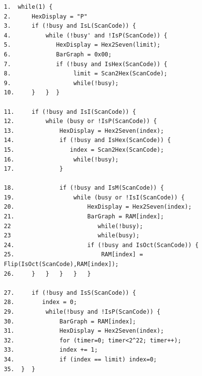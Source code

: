 \documentclass{article}[10 pt,landscape]
\begin{document}
\pagebreak
\begin{verbatim}
1.  while(1) {
2.      HexDisplay = "P"
3.      if (!busy and IsL(ScanCode)) {
4.          while (!busy' and !IsP(ScanCode)) {
5.             HexDisplay = Hex2Seven(limit);
6.             BarGraph = 0x00;
7.             if (!busy and IsHex(ScanCode)) {
8.                  limit = Scan2Hex(ScanCode);
9.                  while(!busy);
10.     }   }  }

11.     if (!busy and IsI(ScanCode)) {
12.         while (busy or !IsP(ScanCode)) {
13.             HexDisplay = Hex2Seven(index);
14.             if (!busy and IsHex(ScanCode)) {
15.                index = Scan2Hex(ScanCode);
16.                 while(!busy);
17.             }

18.             if (!busy and IsM(ScanCode)) {
19.                 while (busy or !IsI(ScanCode)) {
20.                     HexDisplay = Hex2Seven(index);
21.                     BarGraph = RAM[index];
22                         while(!busy);
23                         while(busy);
24.                     if (!busy and IsOct(ScanCode)) {
25.                         RAM[index] = Flip(IsOct(ScanCode),RAM[index]);
26.     }   }   }   }   }

27.     if (!busy and IsS(ScanCode)) {
28.        index = 0;
29.         while(!busy and !IsP(ScanCode)) {
30.             BarGraph = RAM[index];
31.             HexDisplay = Hex2Seven(index);
32.             for (timer=0; timer<2^22; timer++);
33.             index += 1;
34.             if (index == limit) index=0;
35.  }  }
\end{verbatim}
\end{document}

